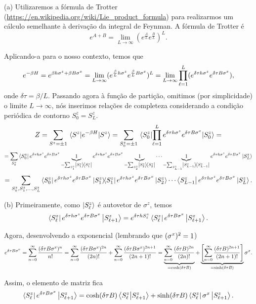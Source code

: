 \documentclass[a4paper,10pt]{article}
\begin{document}
(a) Utilizaremos a fórmula de Trotter (\url{https://en.wikipedia.org/wiki/Lie_product_formula}) para realizarmos um cálculo semelhante à derivação da integral de Feynman. A fórmula de Trotter é
$$
e^{A+B} = \lim_{L\to\infty} (e^{\frac{A}{L}} e^{\frac{B}{L}})^L.
$$

Aplicando-a para o nosso contexto, temos que
$$
e^{-\beta H} = e^{\beta h \sigma^z + \beta B \sigma^x} = \lim_{L\to\infty}
(e^{\frac{\beta}{L} h \sigma^z} e^{\frac{\beta}{L} B \sigma^x})^L =
\lim_{L\to\infty} \prod_{\ell = 1}^L (e^{\delta\tau h \sigma^z} e^{\delta\tau B \sigma^x}),
$$
onde $\delta \tau = \beta / L$. Passando agora à função de partição, omitimos (por simplicidade) o limite $L \to \infty$, nós inserimos relações de completeza considerando a condição periódica de contorno $S_0^z = S_L^z$.
$$
Z = \sum_{S^z = \pm 1} \ev{e^{-\beta H}}{S^z} =
\sum_{S_0^z = \pm 1} \ev{\prod_{\ell=1}^{L} e^{\delta\tau h \s^z} e^{\delta\tau B \s^x}}{S_0^z} =
$$
$$
=
\sum_{S_0^z}
\bra{S_0^z}
e^{\delta\tau h \s^z} e^{\delta\tau B \s^x} \underbrace{1}_{=\sum_{S_1^z} \dyad{S_1^z}}
e^{\delta\tau h \s^z} e^{\delta\tau B \s^x} \underbrace{1}_{=\sum_{S_2^z} \dyad{S_2^z}} \cdots
\underbrace{1}_{=\sum_{S_{L-1}^z} \dyad{S_{L-1}^z}} e^{\delta\tau h \s^z} e^{\delta\tau B \s^x}
\ket{S_L^z}
$$
$$
=
\sum_{S_0^z, S_1^z, \ldots, S_{L}^z}
\bra{S_0^z}
e^{\delta\tau h \s^z} e^{\delta\tau B \s^x} \dyad{S_1^z}
e^{\delta\tau h \s^z} e^{\delta\tau B \s^x} \ket{S_2^z} \cdots
\bra{S_{L-1}^z} e^{\delta\tau h \s^z} e^{\delta\tau B \s^x}
\ket{S_L^z}.
$$

\n

(b) Primeiramente, como $\ket{S_\ell^z}$ é autovetor de $\sigma^z$, temos
$$
\bra{S_{\ell}^z} e^{\delta\tau h \sigma^z} e^{\delta\tau B \sigma^x} \ket{S_{\ell+1}^z} =
e^{\delta\tau h S_{\ell}^z} \bra{S_{\ell}^z} e^{\delta\tau B \sigma^x} \ket{S_{\ell+1}^z}.
$$

Agora, desenvolvendo a exponencial (lembrando que $(\sigma^x)^2 = 1$)
$$
e^{\delta\tau B \sigma^x} = \sum_{n=0}^{\infty} \frac{(\delta\tau B \sigma^x)^n}{n!} =
\sum_{n=0}^{\infty} \frac{(\delta\tau B \sigma^x)^{2n}}{(2n)!} +
\sum_{n=0}^{\infty} \frac{(\delta\tau B \sigma^x)^{2n+1}}{(2n+1)!} =
\underbrace{\sum_{n=0}^{\infty} \frac{(\delta\tau B)^{2n}}{(2n)!}}_{=\cosh(\delta\tau B)} +
\underbrace{\qty[\sum_{n=0}^{\infty} \frac{(\delta\tau B)^{2n+1}}{(2n+1)!}]}_{=\sinh(\delta\tau B)} \sigma^x.
$$

Assim, o elemento de matriz fica
$$
\bra{S_{\ell}^z} e^{\delta\tau B \sigma^x} \ket{S_{\ell+1}^z} =
\cosh(\delta\tau B) \bra{S_{\ell}^z} \ket{S_{\ell+1}^z} +
\sinh(\delta\tau B) \bra{S_{\ell}^z} \sigma^x \ket{S_{\ell+1}^z}.
$$
\end{document}
